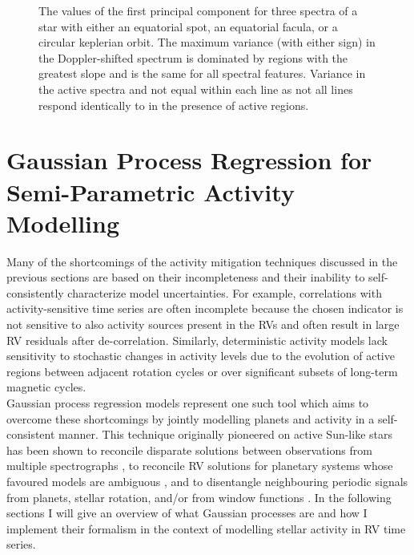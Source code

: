 \begin{figure}
  \centering
  \caption[Principal component analysis of idealized spectra containing either spots, faculae, or planets.]
          {The values of the first principal component for three spectra of a star with either an equatorial
            spot, an equatorial facula, or a circular keplerian orbit. The maximum variance (with either sign)
            in the Doppler-shifted spectrum is dominated by regions with the greatest slope and is the same
            for all spectral features. Variance in the active spectra and not equal within each line as not all
            lines respond identically to in the presence of active regions. \citep[Image credit:][]{davis17}}
  \label{fig:pca}
\end{figure}


\section{Gaussian Process Regression for Semi-Parametric Activity Modelling} \label{sect:gp}
Many of the shortcomings of the activity mitigation techniques discussed in the
previous sections are based on their incompleteness and their inability to
self-consistently characterize model uncertainties. For example, correlations with
activity-sensitive time series are often incomplete because the chosen indicator
is not sensitive to also activity sources present in the RVs and often result in
large RV residuals after de-correlation. Similarly, deterministic activity models
lack sensitivity to stochastic changes in activity levels due to the evolution
of active regions between adjacent rotation cycles or over
significant subsets of long-term magnetic cycles. \\

Gaussian process regression models represent one such tool which aims to overcome
these shortcomings by jointly modelling planets and activity in a self-consistent
manner. This technique originally pioneered on active Sun-like stars
\citep[e.g.][]{haywood14,grunblatt15,faria16,lopezmorales16}
has been shown to reconcile disparate solutions
between observations from multiple spectrographs \citep{rajpaul17,cloutier19},
to reconcile RV solutions for planetary systems whose favoured models are
ambiguous \citep{rajpaul17,cloutier19}, and to disentangle neighbouring periodic
signals from planets, stellar rotation, and/or from window functions
\citep{rajpaul16,cloutier17b}.
In the following sections I will give an overview
of what Gaussian processes are and how I implement their formalism in the context
of modelling stellar activity in RV time series.

